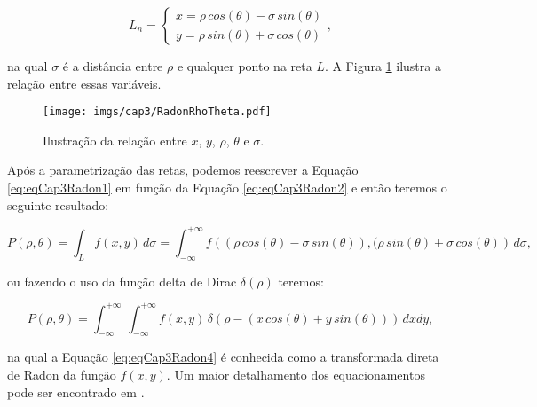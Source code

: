 \begin{equation} 
L_{n} = 
\begin{cases}
x = \rho \, cos(\theta) - \sigma \, sin(\theta)\\ 
y = \rho \, sin(\theta) + \sigma \, cos(\theta)
\end{cases},
\label{eq:eqCap3Radon2}
\end{equation}

\noindent na qual $\sigma$ é a distância entre $\rho$ e qualquer ponto na reta $L$. A Figura \ref{fig:imgCap3RadonRhoTheta} ilustra a relação entre essas variáveis.

\begin{figure}[H]
	\caption{Ilustração da relação entre $x$, $y$, $\rho$, $\theta$ e $\sigma$.}
	\begin{center}
		\texttt{[image: imgs/cap3/RadonRhoTheta.pdf]}
	\end{center}
	\label{fig:imgCap3RadonRhoTheta}
\end{figure}

Após a parametrização das retas, podemos reescrever a Equação \ref{eq:eqCap3Radon1} em função da Equação \ref{eq:eqCap3Radon2} e então teremos o seguinte resultado:

\begin{equation} 
P(\rho,\theta) = \int_{L}^{} f(x,y) \, d\sigma = {\int_{-\infty}^{+\infty} f\left((\rho \, cos(\theta) - \sigma \, sin(\theta)),(\rho \, sin(\theta) + \sigma \, cos(\theta)\right) \, d\sigma},
\label{eq:eqCap3Radon3}
\end{equation}

\noindent ou fazendo o uso da função delta de Dirac $\delta(\rho)$ teremos:

\begin{equation} 
P(\rho,\theta) = {\int_{-\infty}^{+\infty} \, \int_{-\infty}^{+\infty} f(x,y) \, \delta(\rho - (x\,cos(\theta)+y\,sin(\theta)))  \, dxdy},
\label{eq:eqCap3Radon4}
\end{equation} 

\noindent na qual a Equação \ref{eq:eqCap3Radon4} é conhecida como a transformada direta de Radon da função $f(x,y)$. Um maior detalhamento dos equacionamentos pode ser encontrado em .

